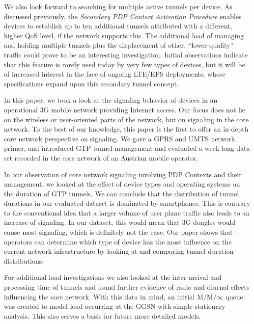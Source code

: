 We also look forward to searching for multiple active tunnels per device. As discussed previously, the \textit{Secondary PDP Context Activation Procedure} enables devices to establish up to ten additional tunnels attributed with a different, higher QoS level, if the network supports this. The additional load of managing and holding multiple tunnels plus the displacement of other, ``lower-quality'' traffic could prove to be an interesting investigation. Initial observations indicate that this feature is rarely used today by very few types of devices, but it will be of increased interest in the face of ongoing LTE/EPS deployments, whose specifications expand upon this secondary tunnel concept.




In this paper, we took a look at the signaling behavior of devices in an operational \gls{3G} mobile network providing Internet access. Our focus does not lie on the wireless or user-oriented parts of the network, but on signaling in the core network. To the best of our knowledge, this paper is the first to offer an in-depth core network perspective on signaling. We gave a \gls{GPRS} and \gls{UMTS} network primer, and introduced \gls{GTP} tunnel management and evaluated a week long data set recorded in the core network of an Austrian mobile operator.

In our observation of core network signaling involving \gls{PDP} Contexts and their management, we looked at the effect of device types and operating systems on the duration of \gls{GTP} tunnels. We can conclude that the distribution of tunnel durations in our evaluated dataset is dominated by smartphones. This is contrary to the conventional idea that a larger volume of user plane traffic also leads to an increase of signaling. In our dataset, this would mean that 3G dongles would cause most signaling, which is definitely not the case. Our paper shows that operators can determine which type of device has the most influence on the current network infrastructure by looking at and comparing tunnel duration distributions.

For additional load investigations we also looked at the inter-arrival and processing time of tunnels and found further evidence of radio and diurnal effects influencing the core network. With this data in mind, an initial M/M/$\infty$ queue was created to model load occurring at the \gls{GGSN} with simple stationary analysis. This also serves a basis for future more detailed models.

